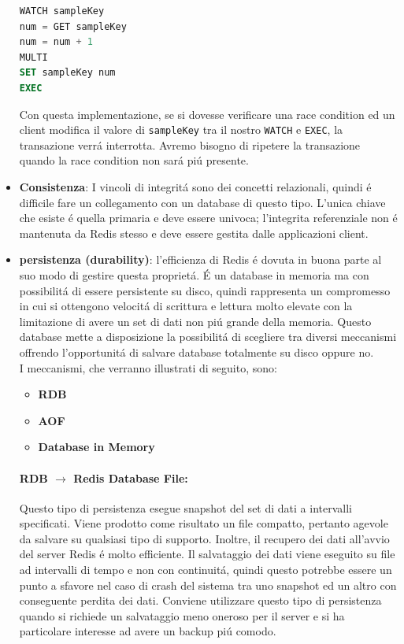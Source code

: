\begin{itemize}
    \begin{lstlisting}[autogobble, style=redis-cli, language=SQL]
WATCH sampleKey
num = GET sampleKey
num = num + 1
MULTI
SET sampleKey num
EXEC\end{lstlisting}

    Con questa implementazione, se si dovesse verificare una race condition ed un client modifica il valore di \texttt{sampleKey} tra il nostro
    \texttt{WATCH} e \texttt{EXEC}, la transazione verrá interrotta. Avremo bisogno di ripetere la transazione quando la race condition non sará
    piú presente.\\

    \item \textbf{Consistenza}: I vincoli di integritá sono dei concetti relazionali, quindi é difficile fare un collegamento con un database di questo tipo.
    L'unica chiave che esiste é quella primaria e deve essere univoca;
    l'integrita referenziale non é mantenuta da Redis stesso e deve essere gestita dalle applicazioni client.

    \item \textbf{persistenza (durability)}:
    l'efficienza di Redis é dovuta in buona parte al suo modo di gestire questa proprietá.
    É un database in memoria ma con possibilitá di essere persistente su disco, quindi rappresenta un compromesso in cui si ottengono
    velocitá di scrittura e lettura molto elevate con la limitazione di avere un set di dati non piú grande della memoria.
    Questo database mette a disposizione la possibilitá di scegliere tra diversi meccanismi
    offrendo l'opportunitá di salvare database
    totalmente su disco oppure no.\\
    I meccanismi, che verranno illustrati di seguito, sono:
      \begin{itemize}
          \item \textbf{RDB}
          \item \textbf{AOF}
          \item \textbf{Database in Memory}
      \end{itemize}%
        
       \paragraph{RDB $\to$ Redis Database File:}
         Questo tipo di persistenza esegue snapshot del set di dati a intervalli specificati. Viene prodotto come risultato un file
         compatto, pertanto agevole da salvare su qualsiasi tipo di supporto. Inoltre, il recupero dei dati all'avvio del server Redis
         é molto efficiente.
         Il salvataggio dei dati viene eseguito su file ad intervalli di tempo e non con continuitá, quindi questo potrebbe essere un punto a sfavore
         nel caso di crash del sistema tra uno snapshot ed un altro con conseguente perdita dei dati.
         Conviene utilizzare questo tipo di persistenza quando si richiede un salvataggio meno oneroso per il server e si ha particolare interesse
         ad avere un backup piú comodo.


\end{itemize}
